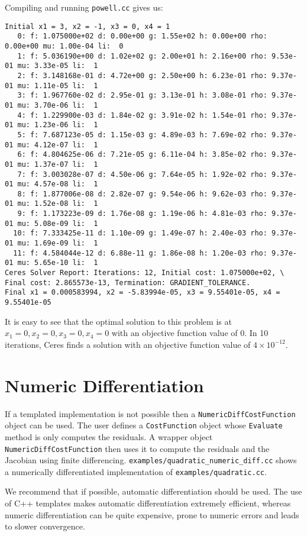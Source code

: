 Compiling and running \texttt{powell.cc} gives us:
\begin{verbatim}
Initial x1 = 3, x2 = -1, x3 = 0, x4 = 1
   0: f: 1.075000e+02 d: 0.00e+00 g: 1.55e+02 h: 0.00e+00 rho: 0.00e+00 mu: 1.00e-04 li:  0
   1: f: 5.036190e+00 d: 1.02e+02 g: 2.00e+01 h: 2.16e+00 rho: 9.53e-01 mu: 3.33e-05 li:  1
   2: f: 3.148168e-01 d: 4.72e+00 g: 2.50e+00 h: 6.23e-01 rho: 9.37e-01 mu: 1.11e-05 li:  1
   3: f: 1.967760e-02 d: 2.95e-01 g: 3.13e-01 h: 3.08e-01 rho: 9.37e-01 mu: 3.70e-06 li:  1
   4: f: 1.229900e-03 d: 1.84e-02 g: 3.91e-02 h: 1.54e-01 rho: 9.37e-01 mu: 1.23e-06 li:  1
   5: f: 7.687123e-05 d: 1.15e-03 g: 4.89e-03 h: 7.69e-02 rho: 9.37e-01 mu: 4.12e-07 li:  1
   6: f: 4.804625e-06 d: 7.21e-05 g: 6.11e-04 h: 3.85e-02 rho: 9.37e-01 mu: 1.37e-07 li:  1
   7: f: 3.003028e-07 d: 4.50e-06 g: 7.64e-05 h: 1.92e-02 rho: 9.37e-01 mu: 4.57e-08 li:  1
   8: f: 1.877006e-08 d: 2.82e-07 g: 9.54e-06 h: 9.62e-03 rho: 9.37e-01 mu: 1.52e-08 li:  1
   9: f: 1.173223e-09 d: 1.76e-08 g: 1.19e-06 h: 4.81e-03 rho: 9.37e-01 mu: 5.08e-09 li:  1
  10: f: 7.333425e-11 d: 1.10e-09 g: 1.49e-07 h: 2.40e-03 rho: 9.37e-01 mu: 1.69e-09 li:  1
  11: f: 4.584044e-12 d: 6.88e-11 g: 1.86e-08 h: 1.20e-03 rho: 9.37e-01 mu: 5.65e-10 li:  1
Ceres Solver Report: Iterations: 12, Initial cost: 1.075000e+02, \
Final cost: 2.865573e-13, Termination: GRADIENT_TOLERANCE.
Final x1 = 0.000583994, x2 = -5.83994e-05, x3 = 9.55401e-05, x4 = 9.55401e-05
\end{verbatim}
It is easy to see that the  optimal solution to this problem is at $x_1=0, x_2=0, x_3=0, x_4=0$ with an objective function value of $0$. In 10 iterations, Ceres finds a solution with an objective function value of $4\times 10^{-12}$.

\section{Numeric Differentiation}
If a templated implementation is not possible then a \texttt{NumericDiffCostFunction} object can be used. The user defines a \texttt{CostFunction} object whose \texttt{Evaluate} method is only computes the residuals. A wrapper object \texttt{NumericDiffCostFunction} then uses it to compute the residuals and the Jacobian using finite differencing.  \texttt{examples/quadratic\_numeric\_diff.cc} shows a numerically differentiated implementation of \texttt{examples/quadratic.cc}.

We recommend that if possible,  automatic differentiation should be used. The use of
C++ templates makes automatic differentiation extremely efficient,
whereas numeric differentiation can be quite expensive, prone to
numeric errors and leads to slower convergence.